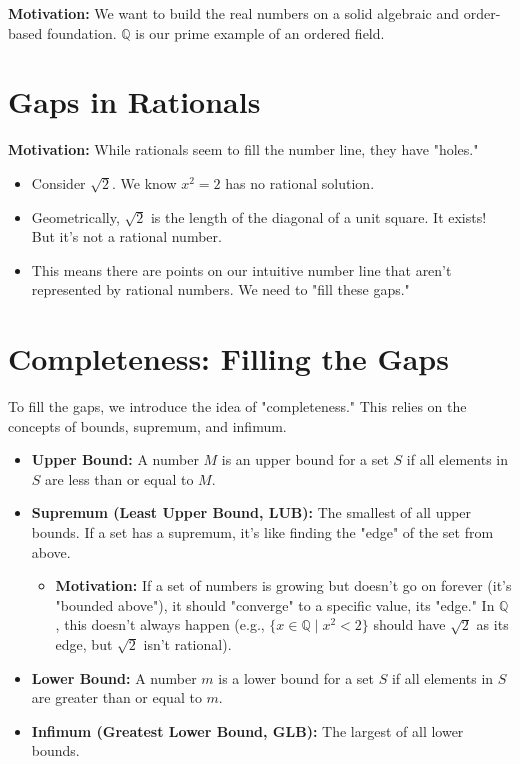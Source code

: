 \documentclass[12pt]{article}
\begin{document}
\textbf{Motivation:} We want to build the real numbers on a solid algebraic and order-based foundation. $\mathbb{Q}$ is our prime example of an ordered field.

\section{Gaps in Rationals}

\textbf{Motivation:} While rationals seem to fill the number line, they have "holes."
\begin{itemize}
    \item Consider $\sqrt{2}$. We know $x^2 = 2$ has no rational solution.
    \item Geometrically, $\sqrt{2}$ is the length of the diagonal of a unit square. It exists! But it's not a rational number.
    \item This means there are points on our intuitive number line that aren't represented by rational numbers. We need to "fill these gaps."
\end{itemize}

\section{Completeness: Filling the Gaps}

To fill the gaps, we introduce the idea of "completeness." This relies on the concepts of bounds, supremum, and infimum.

\begin{itemize}
    \item \textbf{Upper Bound:} A number $M$ is an upper bound for a set $S$ if all elements in $S$ are less than or equal to $M$.
    \item \textbf{Supremum (Least Upper Bound, LUB):} The smallest of all upper bounds. If a set has a supremum, it's like finding the "edge" of the set from above.
    \begin{itemize}
        \item \textbf{Motivation:} If a set of numbers is growing but doesn't go on forever (it's "bounded above"), it should "converge" to a specific value, its "edge." In $\mathbb{Q}$, this doesn't always happen (e.g., $\{x \in \mathbb{Q} \mid x^2 < 2\}$ should have $\sqrt{2}$ as its edge, but $\sqrt{2}$ isn't rational).
    \end{itemize}
    \item \textbf{Lower Bound:} A number $m$ is a lower bound for a set $S$ if all elements in $S$ are greater than or equal to $m$.
    \item \textbf{Infimum (Greatest Lower Bound, GLB):} The largest of all lower bounds.
\end{itemize}
\end{document}
